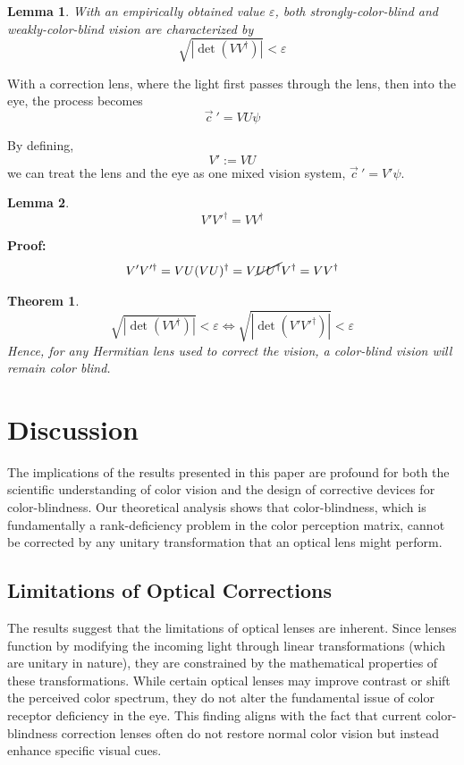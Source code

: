 \documentclass[10pt,a4paper]{article}
\newtheorem{thm}{Theorem} [section]
\newtheorem{lem}{Lemma}[section]
\theoremstyle{definition}
\theoremstyle{remark}
\numberwithin{equation}{section}
\newcommand{\abs}[1]{\left\vert#1\right\vert}
\newcommand{\eps}{\varepsilon}
\newcommand{\pdet}[1]{            \sqrt{\abs{   \det    \left(#1 #1^\dagger \right)   }}               }
\begin{document}
\begin{lem}
With an empirically obtained value $\eps$, both strongly-color-blind and weakly-color-blind vision are characterized by 
\begin{equation}
\pdet{V} < \eps
\end{equation}
\end{lem}


With a correction lens, where the light first passes through the lens, then into the eye, the process becomes
\begin{equation}
\vec{c}~' = V U \psi 
\end{equation}

By defining, 
\begin{equation}
V':=VU
\end{equation}
we can treat the lens and the eye as one mixed vision system, $\vec{c}~' = V' \psi $.

\begin{lem}
\begin{equation}
V' V'^\dagger = V V^\dagger 
\end{equation}
\end{lem}
\textbf{Proof:} 
\begin{eqnarray}
V' V'^\dagger = VU (VU)^\dagger 
                      =  V \cancel{ U U^\dagger } V^\dagger 
                      =  V V^\dagger 
\end{eqnarray}

\begin{thm}
\begin{equation}
\pdet{V} < \eps \iff  \pdet{V'} < \eps
\end{equation}
Hence, for any Hermitian lens used to correct the vision, a color-blind vision will remain color blind.
\end{thm}

\section{Discussion}

The implications of the results presented in this paper are profound for both the scientific understanding of color vision and the design of corrective devices for color-blindness. Our theoretical analysis shows that color-blindness, which is fundamentally a rank-deficiency problem in the color perception matrix, cannot be corrected by any unitary transformation that an optical lens might perform.

\subsection{Limitations of Optical Corrections}
The results suggest that the limitations of optical lenses are inherent. Since lenses function by modifying the incoming light through linear transformations (which are unitary in nature), they are constrained by the mathematical properties of these transformations. While certain optical lenses may improve contrast or shift the perceived color spectrum, they do not alter the fundamental issue of color receptor deficiency in the eye. This finding aligns with the fact that current color-blindness correction lenses often do not restore normal color vision but instead enhance specific visual cues.
\end{document}
